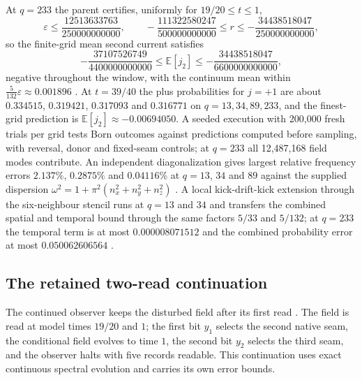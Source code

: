 \documentclass[11pt]{article}
\theoremstyle{definition}
\theoremstyle{remark}
\theoremstyle{plain}
\newcommand{\Ex}{\mathbb{E}}
\begin{document}
At $q=233$ the parent certifies, uniformly for $19/20\le t\le1$,
\[
\varepsilon\le\frac{12513633763}{250000000000},\qquad
-\frac{111322580247}{500000000000}\le r\le-\frac{34438518047}{250000000000},
\]
so the finite-grid mean second current satisfies
\[
-\frac{37107526749}{4400000000000}\le\Ex[j_2]\le-\frac{34438518047}{6600000000000},
\]
negative throughout the window, with the continuum mean within
$\frac5{132}\varepsilon\approx0.001896$ \cite{rSCALAR,sPRED}. At $t=39/40$ the
plus probabilities for $j=+1$ are about $0.334515$, $0.319421$, $0.317093$ and
$0.316771$ on $q=13,34,89,233$, and the finest-grid prediction is
$\Ex[j_2]\approx-0.00694050$. A seeded execution with 200,000 fresh trials
per grid tests Born outcomes against predictions computed before sampling,
with reversal, donor and fixed-seam controls; at $q=233$ all 12,487,168 field
modes contribute. An independent diagonalization gives largest relative
frequency errors $2.137\%$, $0.2875\%$ and $0.04116\%$ at $q=13$, $34$ and
$89$ against the supplied dispersion $\omega^2=1+\pi^2(n_x^2+n_y^2+n_z^2)$
\cite{csCALIB}. A local kick-drift-kick extension through the six-neighbour
stencil runs at $q=13$ and $34$ and transfers the combined spatial and
temporal bound through the same factors $5/33$ and $5/132$; at $q=233$ the
temporal term is at most $0.000008071512$ and the combined probability error
at most $0.050062606564$ \cite{sREADME}.

\subsection{The retained two-read continuation}
\label{sec:two-read}

The continued observer keeps the disturbed field after its first read
\cite{sCONT}. The field is read at model times $19/20$ and $1$; the first bit
$y_1$ selects the second native seam, the conditional field evolves to time
$1$, the second bit $y_2$ selects the third seam, and the observer halts with
five records readable. This continuation uses exact continuous spectral
evolution and carries its own error bounds.
\end{document}

